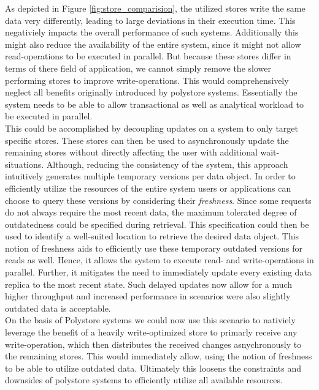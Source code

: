 As depicted in Figure \ref{fig:store_comparision}, the utilized stores write the same data very differently, leading to large deviations in their execution time. 
This negativiely impacts the overall performance of such systems.
Additionally this might also reduce the availability of the entire system, since it might not allow read-operations to be executed in parallel. 
But because these stores differ in terms of there field of application, we cannot simply remove the slower performing stores to improve write-operations. 
This would comprehensively neglect all benefits originally introduced by polystore systems.
Essentially the system needs to be able to allow transactional as well as analytical workload to be executed in parallel.\\
This could be accomplished by decoupling updates on a system to only target specific stores. 
These stores can then be used to asynchronously update
the remaining stores without directly affecting the user with additional wait-situations.
Although, reducing the consistency of the system, this approach intuitively generates multiple temporary versions per data object.
In order to efficiently utilize the resources of the entire system users or applications can choose to query these versions by
considering their \emph{freshness}.
Since some requests do not always require the most recent data, the maximum tolerated degree of outdatedness could be specified during retrieval.
This specification could then be used to identify a well-suited location to retrieve the desired data object. 
This notion of freshness aids to efficiently use these temporary outdated versions for reads as well. 
Hence, it allows the system to execute read- and write-operations in parallel.
Further, it mitigates the need to immediately update every existing data replica to the most recent state.
Such delayed updates now allow for a much higher throughput and increased performance in scenarios were also slightly 
outdated data is acceptable.\\
On the basis of Polystore systems we could now use this scenario to nativiely leverage the benefit of a heavily write-optimized store to 
primarly receive any write-operation, which then distributes the received changes asnychronously to the remaining stores. This
would immediately allow, using the notion of freshness to be able to utilize outdated data.
Ultimately this loosens the constraints and downsides of polystore systems to efficiently utilize all available resources.



